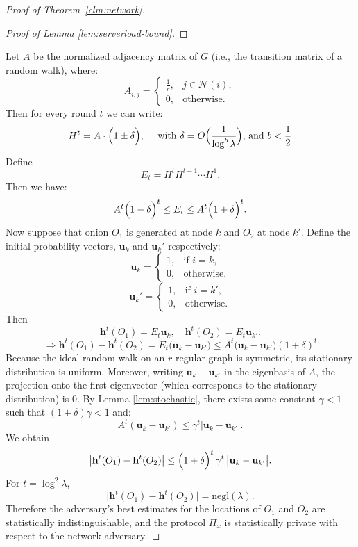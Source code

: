\begin{proof} [Proof of Theorem~\ref{clm:network}]
\begin{proof}[Proof of Lemma \ref{lem:serverload-bound}]
\end{proof}
Let $A$ be the normalized adjacency matrix of $G$ (i.e., the transition matrix of a random walk), where:
$$
A_{i,j} = \begin{cases}
\frac{1}{r}, & j \in \mathcal{N}(i),\\[1mm]
0, & \text{otherwise.}
\end{cases}
$$
Then for every round $t$ we can write:
$$
H^t = A \cdot \Bigl(1 \pm \delta\Bigr), \quad \text{ with $\delta = O\Bigl(\frac{1}{\log^{b} \lambda}\Bigr)$, and $b < \frac{1}{2}$}
$$
Define
$$
E_t = H^t H^{t-1} \cdots H^1.
$$
Then we have:
$$
A^t \Bigl(1 - \delta\Bigr)^t \le E_t \le A^t \Bigl(1 + \delta\Bigr)^t.
$$
Now suppose that onion $O_1$ is generated at node $k$ and $O_2$ at node $k'$. Define the initial probability vectors, $\mathbf{u}_k$ and $\mathbf{u}_k'$ respectively:
$$
\mathbf{u}_k =
\begin{cases}
    1, & \text{if $i = k$},\\
    0, & \text{otherwise.}
\end{cases}
$$
$$
\mathbf{u}_k' =
\begin{cases}
    1, & \text{if $i = k'$},\\
    0, & \text{otherwise.}
\end{cases}
$$
Then
$$
\mathbf{h}^t(O_1) = E_t \mathbf{u}_k,\quad \mathbf{h}^t(O_2) = E_t \mathbf{u}_{k'}.
$$
$$
\Rightarrow \mathbf{h}^t(O_1) - \mathbf{h}^t(O_2) = E_t \bigl( \mathbf{u}_k - \mathbf{u}_{k'} \bigr) \leq A^t \bigl( \mathbf{u}_k - \mathbf{u}_{k'} \bigr) (1 + \delta)^t
$$
Because the ideal random walk on an $r$-regular graph is symmetric, its stationary distribution is uniform. Moreover, writing $\mathbf{u}_k - \mathbf{u}_{k'}$ in the eigenbasis of $A$, the projection onto the first eigenvector (which corresponds to the stationary distribution) is 0. By Lemma \ref{lem:stochastic}, there exists some constant $\gamma < 1$ such that $(1 + \delta)\gamma < 1$ and:
$$
A^t (\mathbf{u}_k - \mathbf{u}_{k'}) \le \gamma^t \bigl| \mathbf{u}_k - \mathbf{u}_{k'} \bigr|.
$$
We obtain
$$
\bigl| \mathbf{h}^t(O_1) - \mathbf{h}^t(O_2) \bigr| \le \Bigl(1 + \delta\Bigr)^t\, \gamma^t\, \bigl| \mathbf{u}_k - \mathbf{u}_{k'} \bigr|.
$$
For $t = \log^2 \lambda$, 
$$
\bigl| \mathbf{h}^t(O_1) - \mathbf{h}^t(O_2) \bigr| = \text{negl}(\lambda).
$$
Therefore the adversary’s best estimates for the locations of $O_1$ and $O_2$ are statistically indistinguishable, and the protocol $\Pi_x$ is statistically private with respect to the network adversary.

\end{proof}


